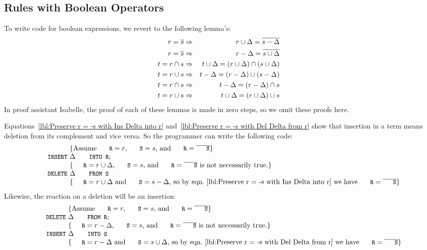 \documentclass{svproc}
\begin{document}
\subsection{Rules with Boolean Operators}
	To write code for boolean expressions,
	we revert to the following lemma's:
\begin{eqnarray}
r=\overline{s}&\Rightarrow&r\cup\Delta=\overline{s-\Delta}\label{lbl:Preserve r = -s with Ins Delta into r}\\
r=\overline{s}&\Rightarrow&r-\Delta=\overline{s\cup\Delta}\label{lbl:Preserve r = -s with Del Delta from r}\\
t=r\cap s&\Rightarrow&t\cup\Delta=(r\cup\Delta)\cap(s\cup\Delta)\label{lbl:Preserve t=r inter s with Ins Delta into t}\\
t=r\cup s&\Rightarrow&t-\Delta=(r-\Delta)\cup(s-\Delta)\label{lbl:Preserve t=r union s with Del Delta from t}\\
t=r\cap s&\Rightarrow&t-\Delta=(r-\Delta)\cap s\label{lbl:Preserve t=r inter s with Del Delta from t}\\
t=r\cup s&\Rightarrow&t\cup\Delta=(r\cup\Delta)\cup s\label{lbl:Preserve t=r union s with Ins Delta into t}
\end{eqnarray}
	In proof assistant Isabelle, the proof of each of these lemmas is made in zero steps, so we omit these proofs here.

	Equations~\ref{lbl:Preserve r = -s with Ins Delta into r} and~\ref{lbl:Preserve r = -s with Del Delta from r}
	show that insertion in a term means deletion from its complement and vice versa.
	So the programmer can write the following code:
\[\begin{array}{r@{~}l}
&\{\text{Assume $\code{R}=r$, $\code{S}=s$, and $\code{R}=\cmpl{\code{S}}$}\}\\
\code{INSERT}&\Delta\code{ INTO R};\\
&\{\text{$\code{R}=r\cup\Delta$, $\code{S}=s$, and $\code{R}=\cmpl{\code{S}}$ is not necessarily true.}\}\\
\code{DELETE}&\Delta\code{ FROM S}\\
&\{\text{$\code{R}=r\cup\Delta$ and $\code{S}=s-\Delta$, so by eqn.~\ref{lbl:Preserve r = -s with Ins Delta into r} we have $\code{R}=\cmpl{\code{S}}$}\}
\end{array}\]
	Likewise, the reaction on a deletion will be an insertion:
\[\begin{array}{r@{~}l}
&\{\text{Assume $\code{R}=r$, $\code{S}=s$, and $\code{R}=\cmpl{\code{S}}$}\}\\
\code{DELETE}&\Delta\code{ FROM R};\\
&\{\text{$\code{R}=r-\Delta$, $\code{S}=s$, and $\code{R}=\cmpl{\code{S}}$ is not necessarily true.}\}\\
\code{INSERT}&\Delta\code{ INTO S}\\
&\{\code{R}=r-\Delta\text{ and }\code{S}=s\cup\Delta\text{, so by eqn.~\ref{lbl:Preserve r = -s with Del Delta from r} we have }\code{R}=\cmpl{\code{S}}\}
\end{array}\]
\end{document}

